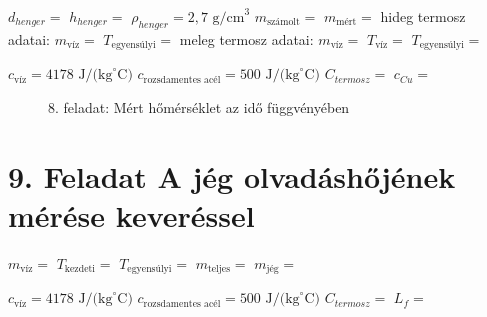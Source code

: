 \documentclass{article}
\begin{document}
$d_{henger}=$
$h_{henger}=$
$\rho_{henger}=2,7 \text{ g/cm}^3$
$m_{\text{számolt}}=$
$m_{\text{mért}}=$
hideg termosz adatai:
$m_{\text{víz}}=$
$T_{\text{egyensúlyi}}=$
meleg termosz adatai:
$m_{\text{víz}}=$
$T_{\text{víz}}=$
$T_{\text{egyensúlyi}}=$

$c_{\text{víz}}= 4178 \text{ J/(kg}^{\circ}\text{C)}$   %
$c_{\text{rozsdamentes acél}}=500 \text{ J/(kg}^{\circ}\text{C)}$
$C_{termosz}=$
$c_{Cu}=$

\begin{figure}[H]
    \centering
    \caption*{8. feladat: Mért hőmérséklet az idő függvényében}
    \label{}
\end{figure}

\section*{9. Feladat A jég olvadáshőjének mérése keveréssel}

$m_{\text{víz}}=$ 
$T_{\text{kezdeti}}=$ 
$T_{\text{egyensúlyi}}=$ 
$m_{\text{teljes}}=$ 
$m_{\text{jég}}=$

$c_{\text{víz}}= 4178 \text{ J/(kg}^{\circ}\text{C)}$   %
$c_{\text{rozsdamentes acél}}=500 \text{ J/(kg}^{\circ}\text{C)}$
$C_{termosz}=$
$L_{f}=$ 
\end{document}
